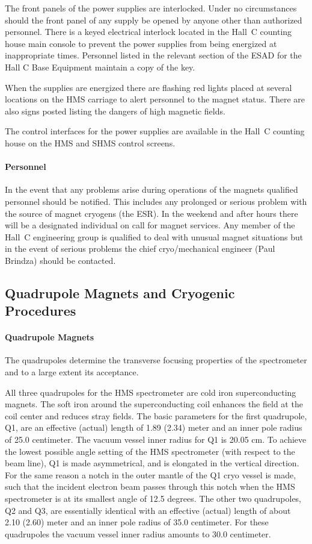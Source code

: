 The front panels of the power supplies are interlocked. Under
no circumstances should the front panel of any supply be opened by anyone other
than authorized personnel. There is a keyed electrical interlock
located in the Hall~C counting house main console to prevent the
power supplies from being energized at inappropriate times.
Personnel listed in the relevant section of the ESAD for the Hall C
Base Equipment maintain a copy
of the key.

When the supplies are energized there are flashing red lights placed at
several locations on the HMS carriage to alert personnel to the magnet
status. There are also signs posted listing the dangers of high magnetic
fields.

The control interfaces for the power supplies are available in the 
Hall~C counting house on the HMS and SHMS control screens.

\paragraph{Personnel}
In the event that any problems arise during operations of the magnets
qualified personnel should be notified. This includes any prolonged
or serious problem with the source of magnet cryogens (the ESR).
In the weekend and after hours there
will be a designated individual on call for magnet services. Any member of
the Hall~C engineering group is qualified to deal with unusual magnet situations
but in the event of serious problems the chief cryo/mechanical engineer (Paul
Brindza) should be contacted.


\subsection{Quadrupole Magnets and Cryogenic Procedures}

\paragraph{Quadrupole Magnets}
The quadrupoles determine the transverse focusing properties of the spectrometer
and to a large extent its acceptance.

All three quadrupoles for the HMS spectrometer are cold iron superconducting
magnets. The soft iron around the superconducting coil enhances the field at
the coil center and reduces stray fields.
The basic parameters for the first quadrupole, Q1, are an effective (actual)
length of 1.89 (2.34) meter and an inner pole radius of
25.0 centimeter. \cite{bi:yan1}
The vacuum vessel
inner radius for Q1 is 20.05 cm. To achieve the lowest possible angle
setting of the HMS spectrometer (with respect to the beam line), Q1 is
made asymmetrical, and is elongated in the vertical direction. For the same
reason a notch in the outer mantle of the Q1 cryo vessel is made, such
that the incident electron beam passes through this notch when the
HMS spectrometer is at its smallest angle of 12.5 degrees.
The other two quadrupoles, Q2 and Q3, are essentially identical with an
effective (actual) length of about 2.10 (2.60) meter and an inner pole radius
of 35.0 centimeter. For these quadrupoles the vacuum vessel inner radius
amounts to 30.0 centimeter.

